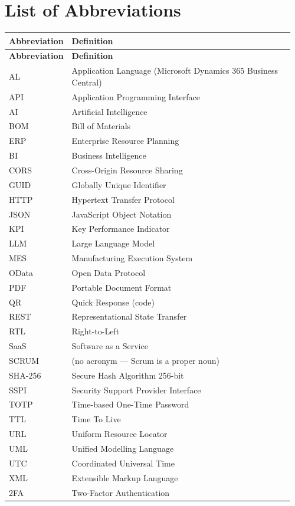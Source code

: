 \documentclass[12pt,a4paper]{report}
\begin{document}
\chapter*{List of Abbreviations}
\begin{longtable}{@{} P{0.18\linewidth} P{0.78\linewidth} @{}}
  \toprule
  \textbf{Abbreviation} & \textbf{Definition} \\
  \midrule
  \endfirsthead
  \toprule \textbf{Abbreviation} & \textbf{Definition} \\ \midrule
  \endhead
  \endlastfoot
  AL      & Application Language (Microsoft Dynamics 365 Business Central) \\
  API     & Application Programming Interface \\
  AI      & Artificial Intelligence \\
  BOM     & Bill of Materials \\
  ERP     & Enterprise Resource Planning \\
  BI      & Business Intelligence \\
  CORS    & Cross-Origin Resource Sharing \\
  GUID    & Globally Unique Identifier \\
  HTTP    & Hypertext Transfer Protocol \\
  JSON    & JavaScript Object Notation \\
  KPI     & Key Performance Indicator \\
  LLM     & Large Language Model \\
  MES     & Manufacturing Execution System \\
  OData   & Open Data Protocol \\
  PDF     & Portable Document Format \\
  QR      & Quick Response (code) \\
  REST    & Representational State Transfer \\
  RTL     & Right-to-Left \\
  SaaS    & Software as a Service \\
  SCRUM   & (no acronym — Scrum is a proper noun) \\
  SHA-256 & Secure Hash Algorithm 256-bit \\
  SSPI    & Security Support Provider Interface \\
  TOTP    & Time-based One-Time Password \\
  TTL     & Time To Live \\
  URL     & Uniform Resource Locator \\
  UML     & Unified Modelling Language \\
  UTC     & Coordinated Universal Time \\
  XML     & Extensible Markup Language \\
  2FA     & Two-Factor Authentication \\
  \bottomrule
\end{longtable}
\newpage
\end{document}
